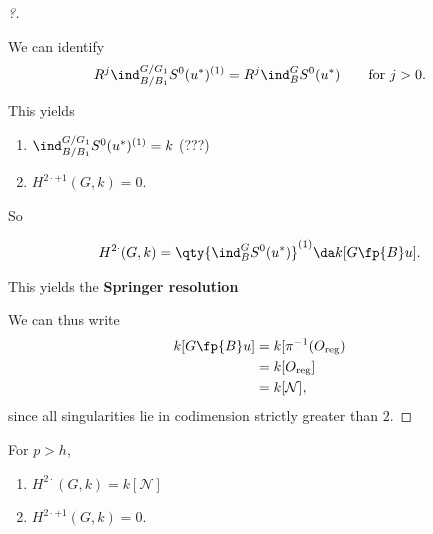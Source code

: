 \begin{proof}[?]

\begin{fact}

We can identify
\begin{align*}  
R^j \ind_{B/B_1}^{G/G_1} S^0(u^*)^{(1)} = R^j \ind_B^G S^0(u^*) \qquad \text{for } j>0
.\end{align*}

\end{fact}

This yields

\begin{enumerate}
\def\labelenumi{\arabic{enumi}.}
\item
  \(\ind_{B/B_1}^{G/G_1} S^0(u^*)^{(1)} = k\) (???)
\item
  \(H^{2\cdot+1}(G, k) = 0\).
\end{enumerate}

So

\begin{align*}  
H^{2\cdot}(G, k) = \qty{ \ind_B^G S^0(u^*)  }^{(1)} \da k[G \fp{B} u]
.\end{align*}

This yields the \textbf{Springer resolution}

\begin{center}
\end{center}

We can thus write
\begin{align*}  
k[G\fp{B} u] 
&= k[ \pi^{-1}(O_{\text{reg}}) \\
&= k[O_{\text{reg}}] \\
&= k[\mathcal{N}]
,\end{align*} since all singularities lie in codimension strictly
greater than \(2\).

\end{proof}

\begin{theorem}[F-P, A-J, 1980s]

For \(p>h\),

\begin{enumerate}
\def\labelenumi{\arabic{enumi}.}
\tightlist
\item
  \(H^{2\cdot }(G, k) = k[{\mathcal{N}}]\)
\item
  \(H^{2\cdot + 1}(G, k) = 0\).
\end{enumerate}

\end{theorem}

